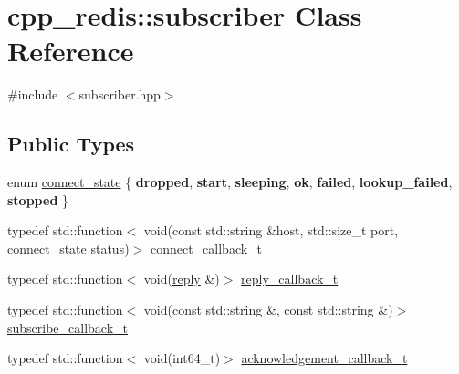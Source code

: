 \hypertarget{classcpp__redis_1_1subscriber}{}\section{cpp\+\_\+redis\+:\+:subscriber Class Reference}
\label{classcpp__redis_1_1subscriber}


{\ttfamily \#include $<$subscriber.\+hpp$>$}

\subsection*{Public Types}
\begin{DoxyCompactItemize}
\item 
enum \hyperlink{classcpp__redis_1_1subscriber_afc976757efd9d0ac4def6935546a2338}{connect\+\_\+state} \{ \newline
{\bfseries dropped}, 
{\bfseries start}, 
{\bfseries sleeping}, 
{\bfseries ok}, 
\newline
{\bfseries failed}, 
{\bfseries lookup\+\_\+failed}, 
{\bfseries stopped}
 \}
\item 
typedef std\+::function$<$ void(const std\+::string \&host, std\+::size\+\_\+t port, \hyperlink{classcpp__redis_1_1subscriber_afc976757efd9d0ac4def6935546a2338}{connect\+\_\+state} status)$>$ \hyperlink{classcpp__redis_1_1subscriber_a90f2f7d4c748c3c2e89d1e977fa6dce1}{connect\+\_\+callback\+\_\+t}
\item 
typedef std\+::function$<$ void(\hyperlink{classcpp__redis_1_1reply}{reply} \&)$>$ \hyperlink{classcpp__redis_1_1subscriber_a99d220cc662664e2399b709f61ac9581}{reply\+\_\+callback\+\_\+t}
\item 
typedef std\+::function$<$ void(const std\+::string \&, const std\+::string \&)$>$ \hyperlink{classcpp__redis_1_1subscriber_ac6ab8ebc526d784e4b79a39bbd73dca8}{subscribe\+\_\+callback\+\_\+t}
\item 
typedef std\+::function$<$ void(int64\+\_\+t)$>$ \hyperlink{classcpp__redis_1_1subscriber_a19ea39dfabeb19937a9ce4c8d21781b4}{acknowledgement\+\_\+callback\+\_\+t}
\end{DoxyCompactItemize}
